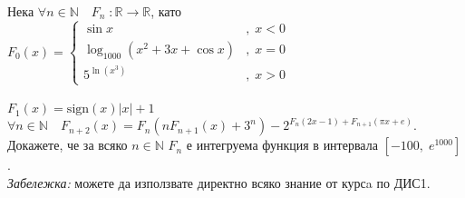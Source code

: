 \documentclass[a4paper, 12pt, oneside]{article}
\newcommand{\R}{\mathbb{R}}
\newcommand{\N}{\mathbb{N}}
\begin{document}
Нека $\forall n \in \N \quad F_n \; : \R \to \R$, като \\

$F_0(x) = \begin{cases}
    \sin x & , \; x < 0 \\
    \log_{1000}(x^2 + 3x + \cos x) & , \; x = 0 \\
    5^{\ln(x^3)} & , \; x > 0
\end{cases}$ \\\\

$F_1(x) = \mathrm{sign}(x)|x| + 1$ \\

$\forall n \in \N \quad F_{n + 2}(x) = F_n(nF_{n + 1}(x) + 3^n) - \displaystyle2^{F_n(2x - 1) + F_{n + 1}(\pi x + e)} $. \\

Докажете, че за всяко $n \in \N$ $F_n$ е интегруема функция в интервала $[-100, \; e^{1000}]$. \\

\textit{Забележка:} можете да използвате директно всяко знание от курсa по ДИС1.
\end{document}
